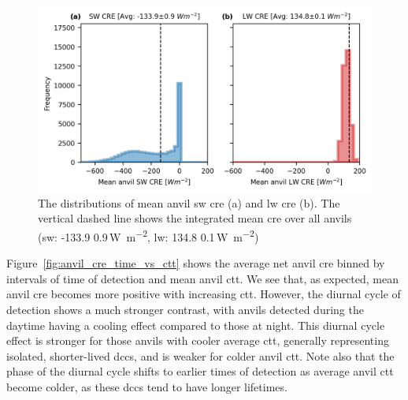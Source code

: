 \begin{figure}[tp]
    \includegraphics[width=\textwidth]{figures/ch3_12.png}
    \caption[
    The distributions of mean anvil \acrshort{sw} \acrshort{cre} and \acrshort{lw} \acrshort{cre}
    ]{
    The distributions of mean anvil \acrshort{sw} \acrshort{cre} (a) and \acrshort{lw} \acrshort{cre} (b). The vertical dashed line shows the integrated mean \acrshort{cre} over all anvils (\acrshort{sw}: -133.9\,\textpm\,0.9\,\unit{W m^{-2}}, \acrshort{lw}: 134.8\,\textpm\,0.1\,\unit{W m^{-2}})
    }
    \label{fig:anvil_sw_lw_cre}
\end{figure}


Figure~\ref{fig:anvil_cre_time_vs_ctt} shows the average net anvil \acrshort{cre} binned by intervals of time of detection and mean anvil \acrshort{ctt}. 
We see that, as expected, mean anvil \acrshort{cre} becomes more positive with increasing \acrshort{ctt}. 
However, the diurnal cycle of detection shows a much stronger contrast, with anvils detected during the daytime having a cooling effect compared to those at night. 
This diurnal cycle effect is stronger for those anvils with cooler average \acrshort{ctt}, generally representing isolated, shorter-lived \acrshort{dcc}s, and is weaker for colder anvil \acrshort{ctt}. 
Note also that the phase of the diurnal cycle shifts to earlier times of detection as average anvil \acrshort{ctt} become colder, as these \acrshort{dcc}s tend to have longer lifetimes.


